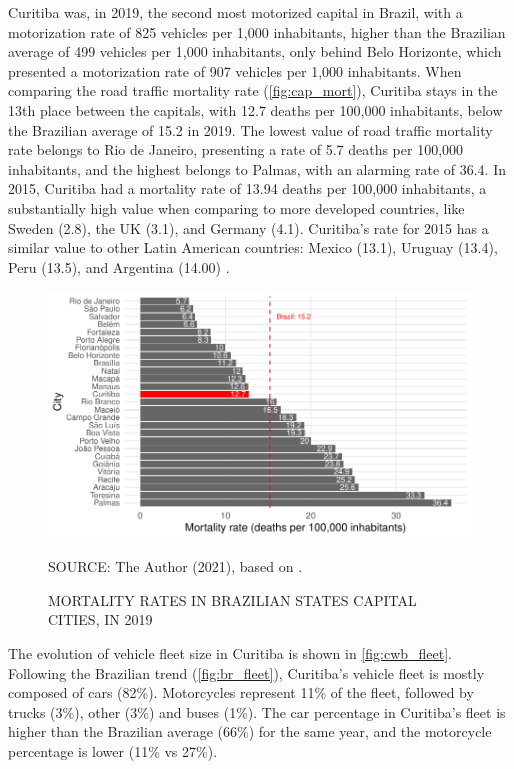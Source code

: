 Curitiba was, in 2019, the second most motorized capital in Brazil, with a motorization rate of 825 vehicles per 1,000 inhabitants, higher than the Brazilian average of 499 vehicles per 1,000 inhabitants, only behind Belo Horizonte, which presented a motorization rate of 907 vehicles per 1,000 inhabitants. When comparing the road traffic mortality rate (\autoref{fig:cap_mort}), Curitiba stays in the 13th place between the capitals, with 12.7 deaths per 100,000 inhabitants, below the Brazilian average of 15.2 in 2019. The lowest value of road traffic mortality rate belongs to Rio de Janeiro, presenting a rate of 5.7 deaths per 100,000 inhabitants, and the highest belongs to Palmas, with an alarming rate of 36.4. In 2015, Curitiba had a mortality rate of 13.94 deaths per 100,000 inhabitants, a substantially high value when comparing to more developed countries, like Sweden (2.8), the UK (3.1), and Germany (4.1). Curitiba's rate for 2015 has a similar value to other Latin American countries: Mexico (13.1), Uruguay (13.4), Peru (13.5), and Argentina (14.00) \cite{WHO2018}. 

\begin{figure}[!htbp]
    \centering\footnotesize
    \captionsetup{font=footnotesize}
    \caption{MORTALITY RATES IN BRAZILIAN STATES CAPITAL CITIES, IN 2019}
    \includegraphics{fig/cap_mort.pdf}
    \label{fig:cap_mort}
    \par SOURCE: The Author (2021), based on \textcite{MinistryofHealth2020,MinistryofHealth2021}.
\end{figure}  

The evolution of vehicle fleet size in Curitiba is shown in \autoref{fig:cwb_fleet}. Following the Brazilian trend (\autoref{fig:br_fleet}), Curitiba's vehicle fleet is mostly composed of cars (82\%). Motorcycles represent 11\% of the fleet, followed by trucks (3\%), other (3\%) and buses (1\%). The car percentage in Curitiba's fleet is higher than the Brazilian average (66\%) for the same year, and the motorcycle percentage is lower (11\% vs 27\%).

